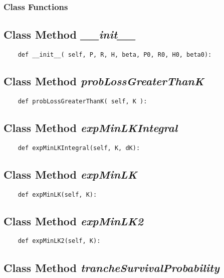 \documentclass[twoside,11pt]{book}
\begin{document}
\subsubsection{Class Functions}

\subsection{Class Method {\it \_\_init\_\_}}


\begin{lstlisting}
    def __init__( self, P, R, H, beta, P0, R0, H0, beta0):
\end{lstlisting}

\subsection{Class Method {\it probLossGreaterThanK}}


\begin{lstlisting}
    def probLossGreaterThanK( self, K ):
\end{lstlisting}

\subsection{Class Method {\it expMinLKIntegral}}


\begin{lstlisting}
    def expMinLKIntegral(self, K, dK):
\end{lstlisting}

\subsection{Class Method {\it expMinLK}}


\begin{lstlisting}
    def expMinLK(self, K):
\end{lstlisting}

\subsection{Class Method {\it expMinLK2}}


\begin{lstlisting}
    def expMinLK2(self, K):
\end{lstlisting}

\subsection{Class Method {\it trancheSurvivalProbability}}
\end{document}
